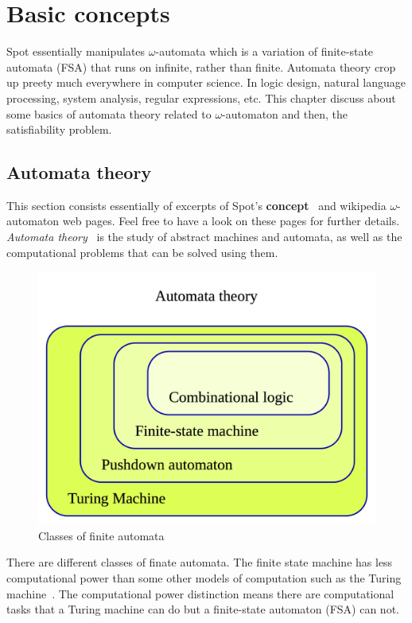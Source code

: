 \chapter{Basic concepts}
\label{basic_concepts}
Spot essentially manipulates $\omega$-automata which is a variation of finite-state automata (FSA) that runs
on infinite, rather than finite. Automata theory crop up preety much everywhere in computer science.
In logic design, natural language processing, system analysis, regular expressions, etc. This
chapter discuss about some basics of automata theory related to $\omega$-automaton and then, the 
satisfiability problem.

\section{Automata theory}
This section consists essentially of excerpts of Spot's \textbf{concept}~\cite{8} and
wikipedia $\omega$-automaton web pages. Feel free to have a look on these pages for further details.\\

\noindent \textit{Automata theory}~\cite{9} is the study of abstract machines and automata, as well as the
computational problems that can be solved using them.

\begin{figure}[H]
 \centering
 \includegraphics[scale=0.2]{img/automata_classes.png}
 \caption{Classes of finite automata~\cite{9}}
 \label{fig:aut_classes}
\end{figure}
There are different classes of finate automata. The finite state machine has less computational power than
some other models of computation such as the Turing machine~\cite{10}. The computational power distinction
means there are computational tasks that a Turing machine can do but a finite-state automaton (FSA) can
not.\\

